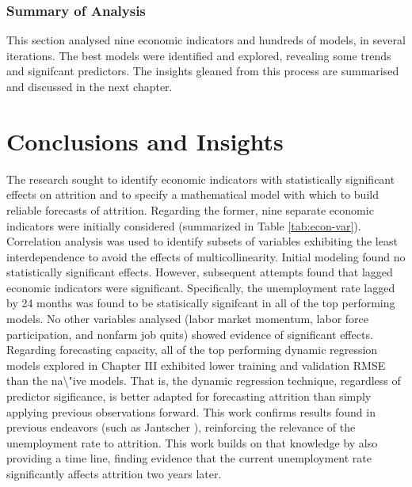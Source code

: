 \documentclass[12pt,letterpaper,toc=flat,oneside]{report}
\theoremstyle{definition}
\theoremstyle{definition}
\theoremstyle{definition}
\theoremstyle{remark}
\begin{document}
\hypertarget{summary-of-analysis}{%
\subsection{Summary of Analysis}\label{summary-of-analysis}}

This section analysed nine economic indicators and hundreds of models,
in several iterations. The best models were identified and explored,
revealing some trends and signifcant predictors. The insights gleaned
from this process are summarised and discussed in the next chapter.

\newpage

\hypertarget{conclusions-and-insights}{%
\chapter{Conclusions and Insights}\label{conclusions-and-insights}}

The research sought to identify economic indicators with statistically
significant effects on attrition and to specify a mathematical model
with which to build reliable forecasts of attrition. Regarding the
former, nine separate economic indicators were initially considered
(summarized in Table \ref{tab:econ-var}). Correlation analysis was used
to identify subsets of variables exhibiting the least interdependence to
avoid the effects of multicollinearity. Initial modeling found no
statistically significant effects. However, subsequent attempts found
that lagged economic indicators were significant. Specifically, the
unemployment rate lagged by 24 months was found to be statisically
signifcant in all of the top performing models. No other variables
analysed (labor market momentum, labor force participation, and nonfarm
job quits) showed evidence of significant effects. Regarding forecasting
capacity, all of the top performing dynamic regression models explored
in Chapter III exhibited lower training and validation RMSE than the
na\textbackslash{}"ive models. That is, the dynamic regression
technique, regardless of predictor sigificance, is better adapted for
forecasting attrition than simply applying previous observations
forward. This work confirms results found in previous endeavors (such as
Jantscher \cite{jantscher-2016}), reinforcing the relevance of the
unemployment rate to attrition. This work builds on that knowledge by
also providing a time line, finding evidence that the current
unemployment rate significantly affects attrition two years later.
\end{document}
